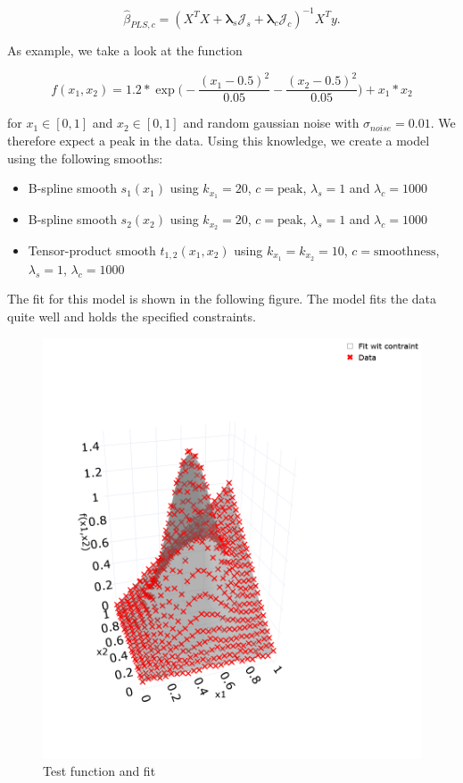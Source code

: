 \documentclass[10pt,a4paper]{article}
\begin{document}
	$$\hat \beta_{PLS,c} = (X^TX + \boldsymbol \lambda_s \mathcal J_s  + \boldsymbol \lambda_c \mathcal J_c)^{-1} X^T y.$$
	
	As example, we take a look at the function 
	
	$$f(x_1, x_2) = 1.2*\exp{\big(-\frac{(x_1 - 0.5)^2}{0.05} - \frac{(x_2 - 0.5)^2}{0.05}\big)} + x_1*x_2$$
	
	for $x_1 \in [0,1]$ and $x_2 \in [0,1]$ and random gaussian noise with $\sigma_{noise} = 0.01$. We therefore expect a peak in the data. Using this knowledge, we create a model using the following smooths:
	
	\begin{itemize}
		\item B-spline smooth $s_1(x_1)$ using $k_{x_1} = 20$, $c = \text{peak}$, $\lambda_s = 1$ and $\lambda_c = 1000$
		\item B-spline smooth $s_2(x_2)$ using $k_{x_2} = 20$, $c = \text{peak}$, $\lambda_s = 1$ and $\lambda_c = 1000$
		\item Tensor-product smooth $t_{1,2}(x_1, x_2)$ using $k_{x_1} = k_{x_2} = 10$, $c = \text{smoothness}$, $\lambda_s = 1$, $\lambda_c=1000$	
	\end{itemize}
		
	The fit for this model is shown in the following figure. The model fits the data quite well and holds the specified constraints.
		
	\begin{figure}[H]
		\centering
		\includegraphics[width=\linewidth]{thesisplots/2d_function.png}
		\caption{Test function and fit}
		\label{fig:2dtestf}
	\end{figure}
\end{document}
